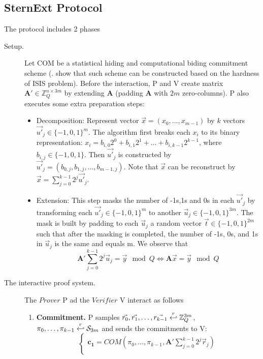 \subsection{SternExt Protocol}
\label{append:Stern}
The protocol includes 2 phases
\begin{description}
\item[Setup.] Let COM be a statistical hiding and computational biding commitment scheme (\cite{kawachi2008concurrently}.
  show that such scheme can be constructed based on the hardness of ISIS problem).  Before the interaction, P and V
  create matrix $\mathbf{A'} \in \mathbb{Z}_Q^{n\times 3m}$ by extending $\mathbf{A}$ (padding $\mathbf{A}$ with $2m$
  zero-columns). P also executes some extra preparation steps:
  \begin{itemize}
  \item Decomposition: Represent vector $\vec{x} = (x_0, \dots, x_{m-1})$ by $k$ vectors
    ${\vec{u'}}_j \in \{-1,0,1\}^m$. The algorithm first breaks each $x_i$ to its binary representation:
    $x_i = b_{i,0}2^0 + b_{i,1}2^1 + \dots + b_{i,k-1}2^{k-1}$, where $b_{i,j} \in \{-1, 0, 1\}$. Then ${\vec{u'}}_j$ is
    constructed by ${\vec{u'}}_j = (b_{0,j}, b_{1,j}, \dots, b_{m-1,j})$. Note that $\vec{x}$ can be reconstruct by
    $\vec{x} = \sum_{j = 0}^{k - 1}2^j{\vec{u'}}_j$.
  \item Extension: This step masks the number of -1s,1s and 0s in each ${\vec{u'}}_j$ by transforming each
    ${\vec{u'}}_j \in \{-1,0,1\}^m$ to another $\vec{u}_j \in \{-1,0,1\}^{3m}$. The mask is built by padding to each
    ${\vec{u}}_j$ a random vector $\vec{t} \in \{-1,0,1\}^{2m}$ such that after the masking is completed, the number of -1s,
    0s, and 1s in $\vec{u}_j$ is the same and equals m. We observe that
    \[
      \mathbf{A'}\sum_{j=0}^{k-1}2^j\vec{u}_j = \vec{y} \mod Q \iff \mathbf{A}\vec{x} = \vec{y} \mod Q
    \]
  \end{itemize}
\item[The interactive proof system.]  The $Prover$ P ad the $Verifier$ V interact as follows
  \begin{enumerate}
  \item \textbf{Commitment.} P samples
    $\vec{r_0}, \vec{r_1}, \dots, \vec{r_{k-1}} \stackrel{r}{\hookleftarrow} \mathbb{Z}_Q^{3m}$,
    $\pi_{0}, \dots, \pi_{k-1} \stackrel{r}{\hookleftarrow} \mathcal{S}_{3m}$ and sends the commitments to V:
    \[
      \begin{cases}
        \mathbf{c_1} = COM(\pi_0,\dots,\pi_{k-1},
        \mathbf{A'}\sum_{j=0}^{k-1}2^j\vec{r}_j) \\

\end{cases}\]
\end{enumerate}
\end{description}
